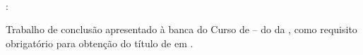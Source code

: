 %
%

\makeatletter
\begin{folhadeaprovacao}

\thispagestyle{empty}%
	
	\begin{center}
    
		\small\textbf{\expandafter\uppercase\expandafter{\imprimirnomeautor}}\\
		\vspace*{8.2 cm}%
		\normalsize\textbf{\expandafter\uppercase\expandafter{\imprimirtitulotb}}{:}
		\normalsize\textbf{\expandafter\uppercase\expandafter{\imprimirsubtitulo}}\\
    \end{center}
	
	\vspace*{0.35 cm}%
		    \large%
    		\hfill%
	    	\begin{minipage}{8 cm}%
	    		\begin{small} %
	    		\setlength{\baselineskip}{0.7\baselineskip}
				
				{Trabalho de conclusão apresentado à banca do Curso de {\imprimircurso} – {\imprimirprograma } do {\imprimirdepartamento} da {\imprimirinstituicao}, como requisito obrigatório para obtenção do título de {\imprimirgrau} em {\imprimircurso}.}\\
				
				\end{small} %
		    \end{minipage}%
		    	
		    	
		    \vspace*{0.6 cm}%
		    
		    \large%
    		\hfill%
	    	 
		    
		    \normalsize %
		    \vspace*{1.5 cm}%
		    
		    \begin{minipage}{9 cm }%
		    \\
		    \end{minipage}%
			
						

\end{folhadeaprovacao}
